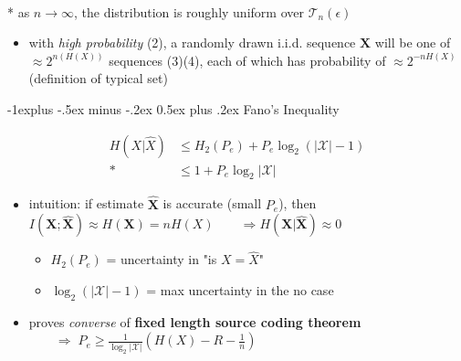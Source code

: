 \documentclass[10pt, landscape]{article}
\makeatletter
\renewcommand{\subsection}{\@startsection{subsection}{2}{0mm}%
  {-1explus -.5ex minus -.2ex}%
  {0.5ex plus .2ex}%
{\normalfont\normalsize\bfseries}}
\makeatother
\begin{document}
\begin{multicols*}{4}
  \begin{tightcenter}
    \\* as $n \to \infty$, the distribution is roughly uniform over $\mathcal{T}_n(\epsilon)$
  \end{tightcenter}

  \begin{itemize}
    \item with \textit{high probability} (2), a randomly drawn i.i.d. sequence $\mathbf{X}$ will be one of $\approx 2^{n(H(X))}$ sequences (3)(4),
      each of which has probability of $\approx 2^{-nH(X)}$ (definition of typical set)
  \end{itemize}


  \subsection{Fano's Inequality}

  \begin{tightcenter}
    \begin{align*}
      H(X \vert \hat{X}) &\leq H_2(P_e) + P_e\log_2 (\vert\mathcal{X}\vert -1)  \\*
                         &\leq 1 + P_e \log_2 \vert \mathcal{X} \vert
    \end{align*}
  \end{tightcenter}

  \begin{itemize}
    \item intuition: if estimate $\hat{\mathbf{X}}$ is accurate (small $P_e$), then
      $I(\mathbf{X};\hat{\mathbf{X}}) \approx H(\mathbf{X}) = nH(X) \quad\quad \Rightarrow H(\mathbf{X}|\hat{\mathbf{X}}) \approx 0$
      \begin{itemize}
        \item $H_2(P_e)$ = uncertainty in "is $X=\hat{X}$"
        \item $\log_2(|\mathcal{X}|-1)$ = max uncertainty in the no case
      \end{itemize}
    \item proves \textit{converse} of \textbf{fixed length source coding theorem}
      $\quad\quad \Rightarrow \; P_e \geq \frac{1}{\log_2|\mathcal{X}|} (H(X) - R - \frac{1}{n})$
  \end{itemize}



\end{multicols*}
\end{document}
